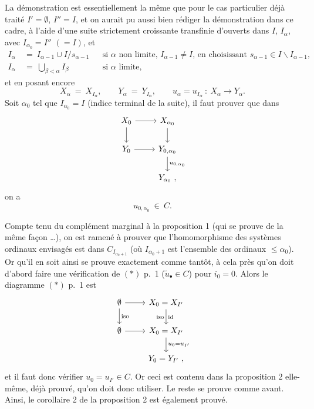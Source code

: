 \documentclass[11pt]{article}
\newcommand{\printedpage}[1]{\marginpar{\footnotesize p.~#1\ifstrequal{#1}{1}{\\[2pt]{[page 1]}}{}}}
\newcommand{\msp}[1]{\ifstrequal{#1}{page 1}{}{\marginpar{\footnotesize [#1]}}}
\begin{document}
\msp{page 21}
La démonstration est essentiellement la même que pour le cas particulier déjà traité $I' = \emptyset$, $I'' = I$, et on aurait pu aussi bien rédiger la démonstration dans ce cadre, à l'aide d'une suite strictement croissante transfinie d'ouverts dans $I$, $I_\alpha$, avec  $I_{\alpha_0} = I''$ $(= I)$, et
\[
\begin{aligned}
I_\alpha \ &= \ I_{\alpha-1} \cup I/s_{\alpha-1} && \text{si $\alpha$ non limite, $I_{\alpha-1} \neq I$, en choisissant $s_{\alpha-1} \in I \backslash I_{\alpha-1}$,} \\
I_\alpha \ &= \ \textstyle\bigcup_{\beta<\alpha} I_\beta && \text{si $\alpha$ limite,}
\end{aligned}
\]
et en posant encore
\[
X_\alpha \ = \ X_{I_\alpha}, \qquad Y_\alpha \ = \ Y_{I_\alpha}, \qquad u_\alpha = u_{I_\alpha} \ : \ X_\alpha \longrightarrow Y_\alpha.
\]
Soit $\alpha_0$ tel que $I_{\alpha_0} = I$ (indice terminal de la suite), il faut prouver que dans
\[
\begin{tikzcd}
X_0 \arrow[r] \arrow[d] & X_{\alpha_0} \arrow[d] \\
Y_0 \arrow[r] & Y_{0,\alpha_0} \arrow[d, "u_{0,\alpha_0}"] \\
 & Y_{\alpha_0}\ ,
\end{tikzcd}
\]
\printedpage{13}
\msp{page 22} on a
\[
u_{0,\alpha_0} \ \in \ C.
\]

Compte tenu du complément marginal à la proposition 1 (qui se prouve de la même façon \ldots), on est ramené à prouver que l'homomorphisme des systèmes ordinaux envisagés est dans $C_{I_{\alpha_0+1}}$ (où $I_{\alpha_0+1}$ est l'ensemble des ordinaux $\leq \alpha_0$). Or qu'il en soit ainsi se prouve exactement comme tantôt, à cela près qu'on doit d'abord faire une vérification de $(*)$ p.~1 ($\tilde{u}_\bullet \in C$) pour $i_0 = 0$. Alors le diagramme $(*)$ p.~1 est
\[
\begin{tikzcd}
\emptyset \arrow[r] \arrow[d, "\mathrm{iso}"] & X_0 = X_{I'} \arrow[d, "\mathrm{iso}"', "\mathrm{id}"] \\
\emptyset \arrow[r] & X_0 = X_{I'} \arrow[d, "u_0 = u_{I'}"] \\
 & Y_0 = Y_{I'}\ ,
\end{tikzcd}
\]
et il faut donc vérifier $u_0 = u_{I'} \in C$. Or ceci est contenu dans la proposition 2 elle-même, déjà prouvé, qu'on doit donc utiliser. %
Le reste se prouve comme avant. Ainsi, le corollaire 2 de la proposition 2 est également prouvé.
\end{document}
